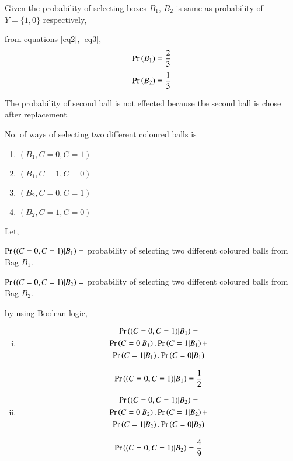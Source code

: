 \documentclass[journal,12pt,twocolumn]{IEEEtran}
\begin{document}
Given the probability of selecting boxes $B_1$, $B_2$ is same as probability of $Y=\{1,0\}$ respectively,

from equations \eqref{eq2}, \eqref{eq3},
\begin{align}\label{eq4}
    \Pr\left(B_1\right)=\frac{2}{3}
\end{align}
\begin{align}\label{eq5}
    \Pr\left(B_2\right)=\frac{1}{3}
\end{align}

The probability of second ball is not effected because the second ball is chose after replacement.
\vspace{0.2in}

No. of ways of selecting two different coloured balls is 
\begin{enumerate}[(1)]
    \item $(B_1,C=0,C=1)$
    \item $(B_1,C=1,C=0)$
    \item $(B_2,C=0,C=1)$
    \item $(B_2,C=1,C=0)$
\end{enumerate}

\vspace{0.2in}

Let, 

\vspace{0.05in}

$\Pr\left((C=0,C=1)|B_1\right) =$ probability of selecting two different coloured balls from Bag $B_1$.

\vspace{0.1in}

$\Pr\left((C=0,C=1)|B_2\right) =$ probability of selecting two different  coloured balls from Bag $B_2$.

\vspace{0.1in}

by using Boolean logic,
\begin{enumerate}[(i)]
    \item 
\begin{multline}
    \Pr\left((C=0,C=1)|B_1\right)=\\
    \Pr\left(C=0|B_1\right).\Pr\left(C=1|B_1\right)+\\
    \Pr\left(C=1|B_1\right).\Pr\left(C=0|B_1\right)
\end{multline}

\begin{align}\label{eq6}
    \Pr\left((C=0,C=1)|B_1\right)=\frac{1}{2}
\end{align}
\item
\begin{multline}
    \Pr\left((C=0,C=1)|B_2\right)=\\
    \Pr\left(C=0|B_2\right).\Pr\left(C=1|B_2\right)+\\
    \Pr\left(C=1|B_2\right).\Pr\left(C=0|B_2\right)
\end{multline}

\begin{align}\label{eq7}
    \Pr\left((C=0,C=1)|B_2\right)=\frac{4}{9}
\end{align}
\end{enumerate}
\end{document}
